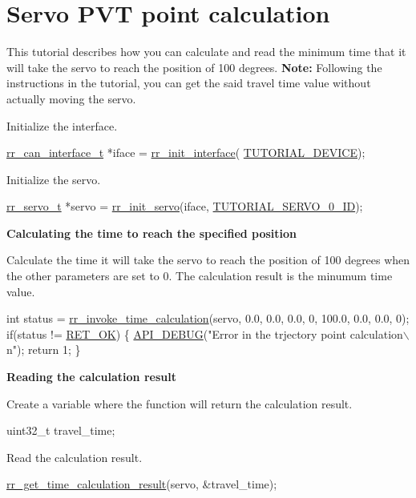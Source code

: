 \hypertarget{group__tutor__c__calculate__point}{}\section{Servo P\+VT point calculation}
\label{group__tutor__c__calculate__point}
This tutorial describes how you can calculate and read the minimum time that it will take the servo to reach the position of 100 degrees. {\bfseries  Note\+:} Following the instructions in the tutorial, you can get the said travel time value without actually moving the servo.


\begin{DoxyEnumerate}
\item Initialize the interface. 
\begin{DoxyCodeInclude}
    \hyperlink{structrr__can__interface__t}{rr\_can\_interface\_t} *iface = \hyperlink{group___init_ga472a4890dcc7d7a13123c56a06946d91}{rr\_init\_interface}(
      \hyperlink{tutorial_8h_a90947332a0345dc693905e3fc04dbeb2}{TUTORIAL\_DEVICE});
\end{DoxyCodeInclude}

\item Initialize the servo. 
\begin{DoxyCodeInclude}
    \hyperlink{structrr__servo__t}{rr\_servo\_t} *servo = \hyperlink{group___init_ga0adb313a3eeb8a4399431e940a1f3e9e}{rr\_init\_servo}(iface, 
      \hyperlink{tutorial_8h_a9a3d33f25d3a72a8e30c885d238b3b65}{TUTORIAL\_SERVO\_0\_ID});
\end{DoxyCodeInclude}
 {\bfseries  Calculating the time to reach the specified position }
\item Calculate the time it will take the servo to reach the position of 100 degrees when the other parameters are set to 0. The calculation result is the minumum time value. 
\begin{DoxyCodeInclude}
    \textcolor{keywordtype}{int} status = \hyperlink{group___trajectory_gabaa2275097c9ec4bb2807b65d83e3303}{rr\_invoke\_time\_calculation}(servo, 0.0, 0.0, 0.0, 0, 100.0, 0.0, 
      0.0, 0);
    \textcolor{keywordflow}{if}(status != \hyperlink{api_8h_a92d5be5038abcf89837faf85a08debdca4894234446e2d92068943b3d6d3a0bdc}{RET\_OK})
    \{
        \hyperlink{api_8h_a0e4aafa2ca9bd25219713176906b7c40}{API\_DEBUG}(\textcolor{stringliteral}{"Error in the trjectory point calculation\(\backslash\)n"});
        \textcolor{keywordflow}{return} 1;
    \}
\end{DoxyCodeInclude}
 {\bfseries  Reading the calculation result }
\item Create a variable where the function will return the calculation result. 
\begin{DoxyCodeInclude}
    uint32\_t travel\_time;
\end{DoxyCodeInclude}

\item Read the calculation result. 
\begin{DoxyCodeInclude}
    \hyperlink{group___trajectory_ga0d01b53187b97dacd7611dacb37024d8}{rr\_get\_time\_calculation\_result}(servo, &travel\_time);
\end{DoxyCodeInclude}

\end{DoxyEnumerate}